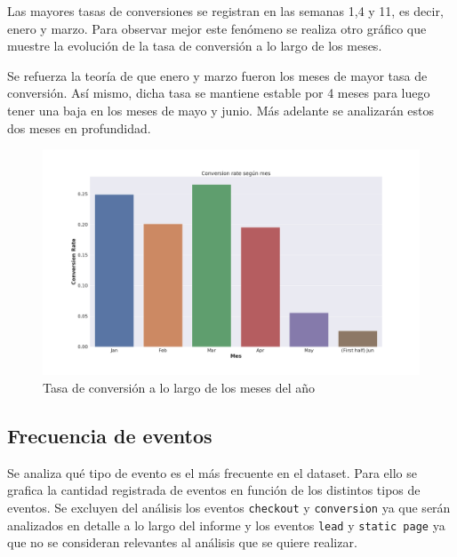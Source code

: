 \documentclass[a4paper]{article}
\begin{document}
Las mayores tasas de conversiones se registran en las semanas 1,4 y 11, es decir, enero y marzo. Para observar mejor este fenómeno se realiza otro gráfico que muestre la evolución de la tasa de conversión a lo largo de los meses. 

Se refuerza la teoría de que enero y marzo fueron los meses de mayor tasa de conversión. Así mismo, dicha tasa se mantiene estable por 4 meses para luego tener una baja en los meses de mayo y junio. Más adelante se analizarán estos dos meses en profundidad.

\begin{figure}[h!]
	\includegraphics[width=\textwidth]{figures/011-conversion_rate_mes-barplot.png}
	\caption{Tasa de conversión a lo largo de los meses del año}
	\label{fig:conversionratemonthly}
\end{figure}

\subsection{Frecuencia de eventos}

Se analiza qué tipo de evento es el más frecuente en el dataset. Para ello se grafica la cantidad registrada de eventos en función de los distintos tipos de eventos. Se excluyen del análisis los eventos \texttt{checkout} y \texttt{conversion} ya que serán analizados en detalle a lo largo del informe y los eventos \texttt{lead} y \texttt{static page} ya que no se consideran relevantes al análisis que se quiere realizar.
\end{document}
